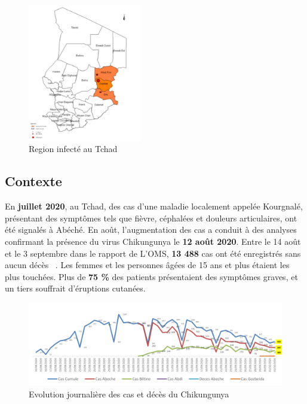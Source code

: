 \begin{figure}[!h]
	\begin{center}
		\includegraphics[height=6cm]{images/chadmap}
	\end{center}
	\caption{Region infecté au Tchad}
	\label{fig:chikvintchadmap}
\end{figure}

\subsection{Contexte}
En \textbf{juillet 2020}, au Tchad, des cas d'une maladie localement appelée Kourgnalé, présentant des symptômes tels que fièvre, céphalées et douleurs articulaires, ont été signalés à Abéché. En août, l'augmentation des cas a conduit à des analyses confirmant la présence du virus Chikungunya le \textbf{12 août 2020}. Entre le 14 août et le 3 septembre dans le rapport de L'OMS, \textbf{13 488} cas ont été enregistrés sans aucun décès ~\cite{rapport2020oms}. Les femmes et les personnes âgées de 15 ans et plus étaient les plus touchées. Plus de \textbf{75 \%} des patients présentaient des symptômes graves, et un tiers souffrait d'éruptions cutanées.
\begin{figure}[h!]
	\centering
	\includegraphics[width=0.9\linewidth]{images/cumul_cases_chad}
	\caption{ Evolution journalière des cas et décès du Chikungunya}
	\label{fig:cumulcaseschad}
\end{figure}

